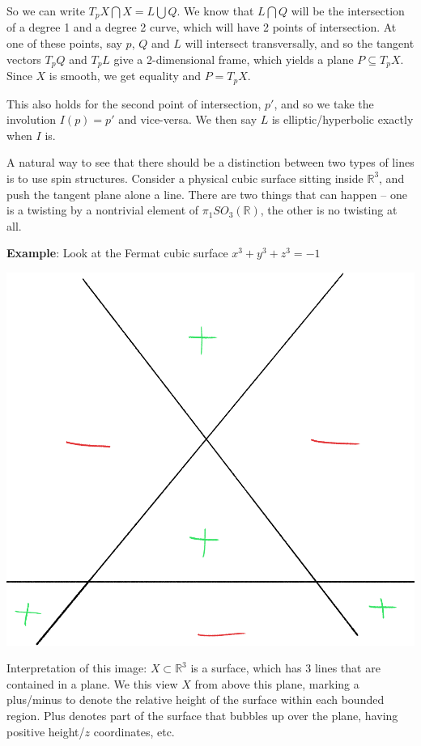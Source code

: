 \documentclass[11pt]{scrreprt}
\theoremstyle{definition}
\newcommand{\RR}[0]{{\mathbb{R}}}
\newcommand{\intersect}[0]{\bigcap}
\newcommand{\union}[0]{\bigcup}
\begin{document}
So we can write \(T_pX \intersect X = L \union Q\). We know that
\(L \intersect Q\) will be the intersection of a degree 1 and a degree 2
curve, which will have 2 points of intersection. At one of these points,
say \(p\), \(Q\) and \(L\) will intersect transversally, and so the
tangent vectors \(T_pQ\) and \(T_pL\) give a 2-dimensional frame, which
yields a plane \(P \subseteq T_pX\). Since \(X\) is smooth, we get
equality and \(P = T_pX\).

This also holds for the second point of intersection, \(p'\), and so we
take the involution \(I(p) = p'\) and vice-versa. We then say \(L\) is
elliptic/hyperbolic exactly when \(I\) is.

A natural way to see that there should be a distinction between two
types of lines is to use spin structures. Consider a physical cubic
surface sitting inside \(\RR^3\), and push the tangent plane alone a
line. There are two things that can happen -- one is a twisting by a
nontrivial element of \(\pi_1 SO_3(\RR)\), the other is no twisting at
all.

\textbf{Example}: Look at the Fermat cubic surface \(x^3+y^3+z^3=-1\)

\begin{center}
\includegraphics[scale=0.25]{../assets/2019-03-03-22-11-15.png}
\end{center}

Interpretation of this image: \(X \subset \RR^3\) is a surface, which
has 3 lines that are contained in a plane. We this view \(X\) from above
this plane, marking a plus/minus to denote the relative height of the
surface within each bounded region. Plus denotes part of the surface
that bubbles up over the plane, having positive height/\(z\)
coordinates, etc.
\end{document}
